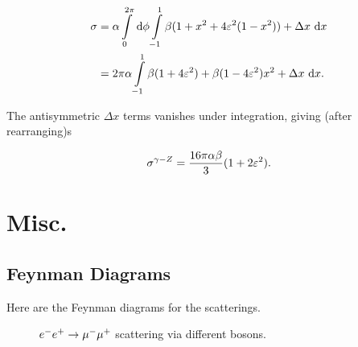 \documentclass[]{report}
\begin{document}
\begin{align*}
\sigma &= \alpha \int\limits_{0}^{2\pi}\d{\phi}
	\int\limits_{-1}^{1}
		\beta(1+x^{2}+4\varepsilon^{2}(1- x^{2}))
    	+ \Delta x
	\d{x}
\\
&= 2\pi\alpha \int\limits_{-1}^{1} \beta(1+4\varepsilon^{2})+\beta(1-4\varepsilon^{2})x^{2} + \Delta x \d{x}.
\end{align*}

The antisymmetric $\Delta x$ terms vanishes under integration, giving (after rearranging)s

$$
\sigma^{\gamma-\Zzero} = \frac{16\pi\alpha\beta}{3}(1 + 2\varepsilon^{2}).
$$

\chapter{Misc.}

\section{Feynman Diagrams}

Here are the Feynman diagrams for the scatterings.

\begin{figure}[h]
	\vspace{10pt}
	\centering
	\qquad
	\caption{$e^{-}e^{+}\rarrow\mu^{-}\mu^{+}$ scattering via different bosons.}
\end{figure}
\end{document}
